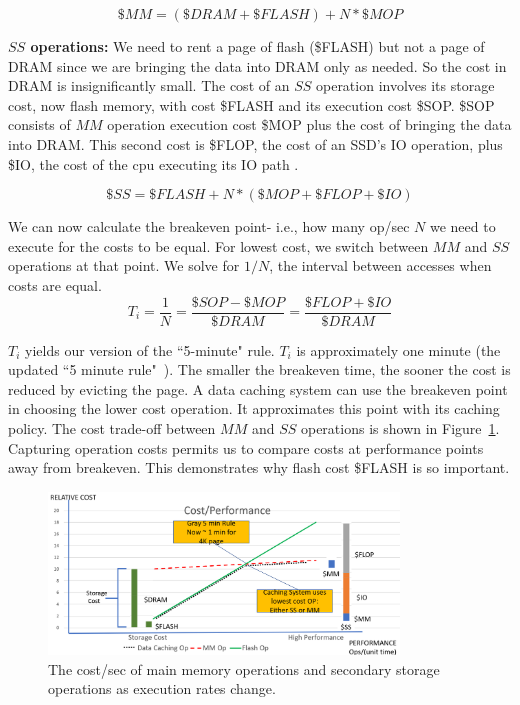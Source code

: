 \documentclass[11pt]{article}
\begin{document}
\begin{equation}\$MM = (\$DRAM + \$FLASH) + N*\$MOP \end{equation} 

{\bf $SS$ operations:} We need to rent a page of flash (\$FLASH) but not a page of DRAM since we are bringing the data into DRAM only as needed.  So the cost in DRAM is insignificantly small.  The cost of an $SS$ operation involves its storage cost, now flash memory, with cost \$FLASH and its execution cost \$SOP.  \$SOP consists of $MM$ operation execution cost \$MOP plus the cost of bringing the data into DRAM.  This second cost is \$FLOP, the cost of an SSD's IO operation, plus \$IO, the cost of the cpu executing its IO path .

  
\begin{equation}\$SS = \$FLASH + N*(\$MOP + \$FLOP + \$IO) \end{equation} 

We can now calculate the breakeven point- i.e., how many op/sec $N$ we need to execute for the costs to be equal.  For lowest cost, we switch between $MM$ and $SS$ operations at that point. 
We solve for $1/N$, the interval between accesses when costs are equal.
\begin{equation} \label{eq:Ti}
T_i = \frac{1}{N} = \frac{\$SOP - \$MOP}{\$DRAM} = \frac{\$FLOP + \$IO}{\$DRAM}
\end{equation}

$T_i$ yields our version of the ``5-minute" rule.  $T_i$ is approximately one minute (the updated ``5 minute rule"~\cite{gray1}). The smaller the breakeven time, the sooner the cost is reduced by evicting the page.  A data caching system can use the breakeven point in choosing the lower cost operation.   It approximates this point with its caching policy.  The cost trade-off between $MM$ and $SS$ operations is shown in Figure~\ref{fig:MMSS}. Capturing operation costs permits us to compare costs at performance points away from breakeven. This demonstrates why flash cost \$FLASH is so important.


\begin{figure}
\centering
\includegraphics[height=1.7in]{letters/breakeven.png}
\caption{The cost/sec of main memory operations and secondary storage operations as execution rates change.}
\label{fig:MMSS}
\end{figure}
\end{document}
